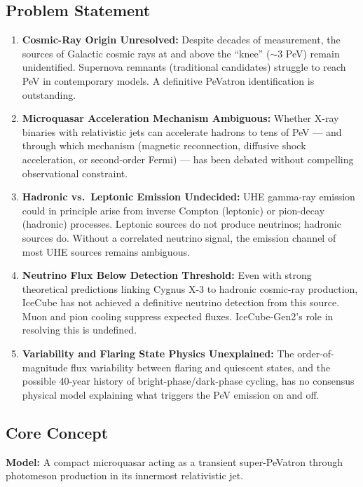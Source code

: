 \documentclass[11pt,letterpaper]{article}
\begin{document}
\subsection{Problem Statement}

\begin{enumerate}
  \item \textbf{Cosmic-Ray Origin Unresolved:} Despite decades of measurement, the sources of Galactic cosmic rays at and above the ``knee'' ($\sim$3 PeV) remain unidentified. Supernova remnants (traditional candidates) struggle to reach PeV in contemporary models. A definitive PeVatron identification is outstanding.

  \item \textbf{Microquasar Acceleration Mechanism Ambiguous:} Whether X-ray binaries with relativistic jets can accelerate hadrons to tens of PeV --- and through which mechanism (magnetic reconnection, diffusive shock acceleration, or second-order Fermi) --- has been debated without compelling observational constraint.

  \item \textbf{Hadronic vs.\ Leptonic Emission Undecided:} UHE gamma-ray emission could in principle arise from inverse Compton (leptonic) or pion-decay (hadronic) processes. Leptonic sources do not produce neutrinos; hadronic sources do. Without a correlated neutrino signal, the emission channel of most UHE sources remains ambiguous.

  \item \textbf{Neutrino Flux Below Detection Threshold:} Even with strong theoretical predictions linking Cygnus X-3 to hadronic cosmic-ray production, IceCube has not achieved a definitive neutrino detection from this source. Muon and pion cooling suppress expected fluxes. IceCube-Gen2's role in resolving this is undefined.

  \item \textbf{Variability and Flaring State Physics Unexplained:} The order-of-magnitude flux variability between flaring and quiescent states, and the possible 40-year history of bright-phase/dark-phase cycling, has no consensus physical model explaining what triggers the PeV emission on and off.
\end{enumerate}

\subsection{Core Concept}

\textbf{Model:} A compact microquasar acting as a transient super-PeVatron through photomeson production in its innermost relativistic jet.
\end{document}

